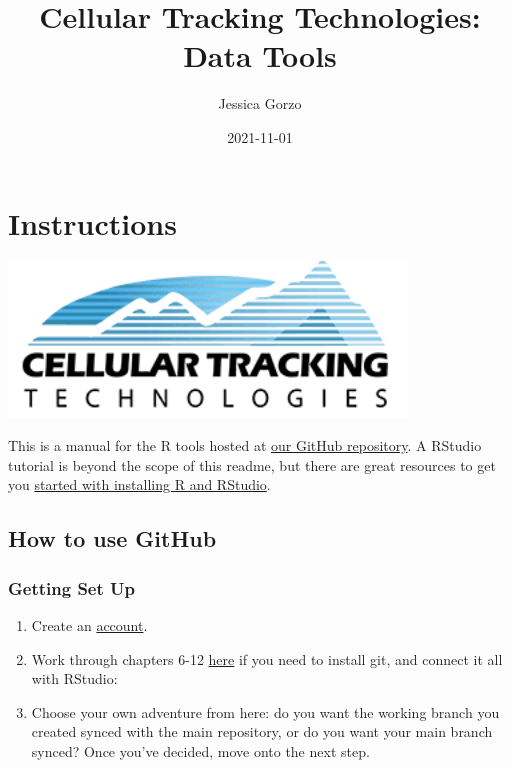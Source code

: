 \documentclass[
]{book}
\title{Cellular Tracking Technologies: Data Tools}
\author{Jessica Gorzo}
\date{2021-11-01}
\providecommand{\tightlist}{%
  \setlength{\itemsep}{0pt}\setlength{\parskip}{0pt}}
\begin{document}
\maketitle

{
\setcounter{tocdepth}{1}
\tableofcontents
}
\hypertarget{instructions}{%
\chapter*{Instructions}\label{instructions}}

\includegraphics[width=4.17in]{bookdown-demo_files/figure-html/unnamed}

This is a manual for the R tools hosted at \href{https://github.com/cellular-tracking-technologies/data_tools}{our GitHub repository}. A RStudio tutorial is beyond the scope of this readme, but there are great resources to get you \href{https://www.earthdatascience.org/courses/earth-analytics/document-your-science/setup-r-rstudio/}{started with installing R and RStudio}.

\hypertarget{how-to-use-github}{%
\section*{How to use GitHub}\label{how-to-use-github}}

\hypertarget{getting-set-up}{%
\subsection*{Getting Set Up}\label{getting-set-up}}

\begin{enumerate}
\def\labelenumi{\arabic{enumi}.}
\tightlist
\item
  Create an \href{https://github.com}{account}.
\item
  Work through chapters 6-12 \href{https://happygitwithr.com/install-git.html}{here} if you need to install git, and connect it all with RStudio:
\item
  Choose your own adventure from here: do you want the working branch you created synced with the main repository, or do you want your main branch synced? Once you've decided, move onto the next step.
\end{enumerate}
\end{document}

